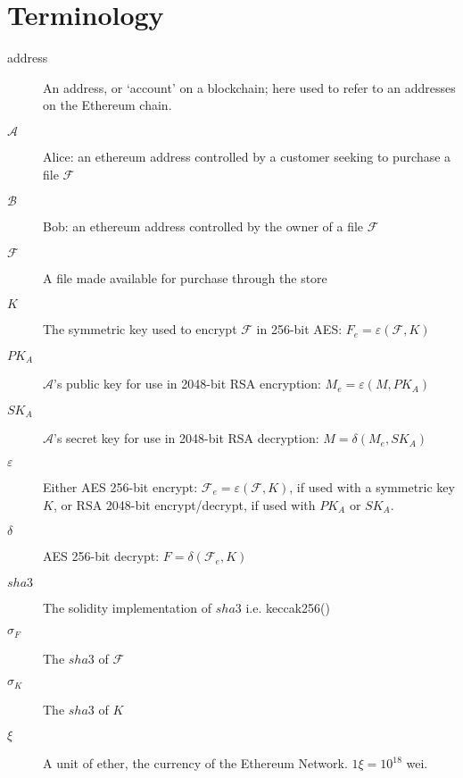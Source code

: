 \documentclass[12pt,oneside]{amsart}
\makeatletter
\def\file{\mathcal{F}}
\def\filehash{\sigma_F}
\def\key{K}
\def\keyhash{\sigma_K}
\def\hash{sha3}
\def\alice{\mathcal{A}}
\def\bob{\mathcal{B}}
\def\ether{\xi}
\def\encrypt{\varepsilon}
\def\decrypt{\delta}
\newcommand*\ie{i.e.\@\xspace}
\makeatother
\begin{document}



\appendix
\section{Terminology} \label{ch:Terminology}

\begin{description}
\item[address] An address, or `account' on a blockchain; here used to refer to an addresses on the Ethereum chain.

\item[$\alice$] Alice: an ethereum address controlled by a customer seeking to purchase a file $\file$

\item[$\bob$] Bob: an ethereum address controlled by the owner of a file $\file$

\item[$\file$] A file made available for purchase through the store

\item[$\key$] The symmetric key used to encrypt $\file$ in 256-bit AES: $F_e = \encrypt(\file, \key)$

\item[$PK_A$] $\alice$'s public key for use in 2048-bit RSA encryption: $M_e = \encrypt(M, PK_A)$

\item[$SK_A$] $\alice$'s secret key for use in 2048-bit RSA decryption: $M = \decrypt(M_e, SK_A)$

\item[$\encrypt$] Either AES 256-bit encrypt: $\file_e = \encrypt(\file, \key)$, if used with a symmetric key $\key$, or RSA 2048-bit encrypt/decrypt, if used with $PK_A$ or $SK_A$.

\item[$\decrypt$] AES 256-bit decrypt: $F = \decrypt(\file_e, \key)$

\item[$\hash$] The solidity implementation of $\hash$ \ie keccak256()

\item[$\filehash$] The $\hash$ of $\file$

\item[$\keyhash$] The $\hash$ of $\key$

\item[$\ether$] A unit of ether, the currency of the Ethereum Network. $1 \xi = 10^{18}$ wei.


\end{description}
\end{document}
